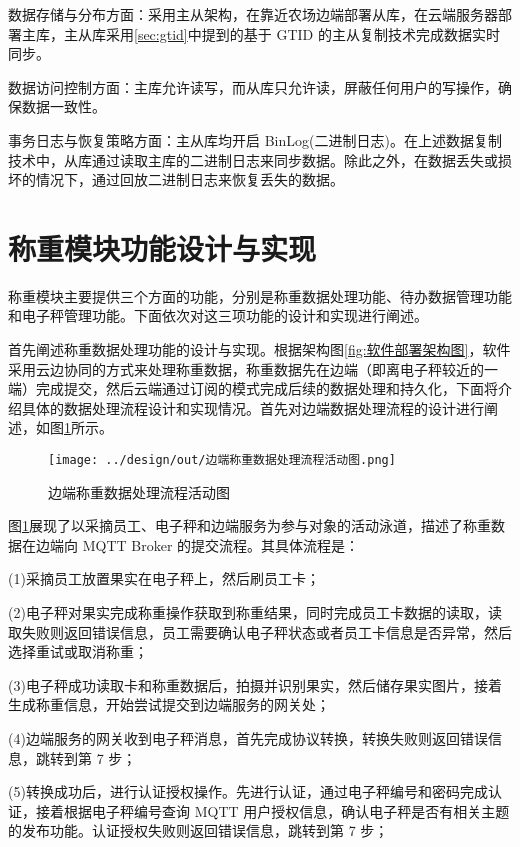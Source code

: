 数据存储与分布方面：采用主从架构，在靠近农场边端部署从库，在云端服务器部署主库，主从库采用\ref{sec:gtid}中提到的基于 GTID 的主从复制技术完成数据实时同步。

数据访问控制方面：主库允许读写，而从库只允许读，屏蔽任何用户的写操作，确保数据一致性。

事务日志与恢复策略方面：主从库均开启 BinLog(二进制日志)。在上述数据复制技术中，从库通过读取主库的二进制日志来同步数据。除此之外，在数据丢失或损坏的情况下，通过回放二进制日志来恢复丢失的数据。

\section{称重模块功能设计与实现}\label{sec:weigh-mod}

称重模块主要提供三个方面的功能，分别是称重数据处理功能、待办数据管理功能和电子秤管理功能。下面依次对这三项功能的设计和实现进行阐述。

首先阐述称重数据处理功能的设计与实现。根据架构图\ref{fig:软件部署架构图}，软件采用云边协同的方式来处理称重数据，称重数据先在边端（即离电子秤较近的一端）完成提交，然后云端通过订阅的模式完成后续的数据处理和持久化，下面将介绍具体的数据处理流程设计和实现情况。首先对边端数据处理流程的设计进行阐述，如图\ref{fig:边端称重数据处理流程活动图}所示。

\begin{figure}
    \centering
    \texttt{[image: ../design/out/边端称重数据处理流程活动图.png]}
    \caption{边端称重数据处理流程活动图}
    \label{fig:边端称重数据处理流程活动图}
\end{figure}

图\ref{fig:边端称重数据处理流程活动图}展现了以采摘员工、电子秤和边端服务为参与对象的活动泳道，描述了称重数据在边端向 MQTT Broker 的提交流程。其具体流程是：

(1)采摘员工放置果实在电子秤上，然后刷员工卡；

(2)电子秤对果实完成称重操作获取到称重结果，同时完成员工卡数据的读取，读取失败则返回错误信息，员工需要确认电子秤状态或者员工卡信息是否异常，然后选择重试或取消称重；

(3)电子秤成功读取卡和称重数据后，拍摄并识别果实，然后储存果实图片，接着生成称重信息，开始尝试提交到边端服务的网关处；

(4)边端服务的网关收到电子秤消息，首先完成协议转换，转换失败则返回错误信息，跳转到第 7 步；

(5)转换成功后，进行认证授权操作。先进行认证，通过电子秤编号和密码完成认证，接着根据电子秤编号查询 MQTT 用户授权信息，确认电子秤是否有相关主题的发布功能。认证授权失败则返回错误信息，跳转到第 7 步；

